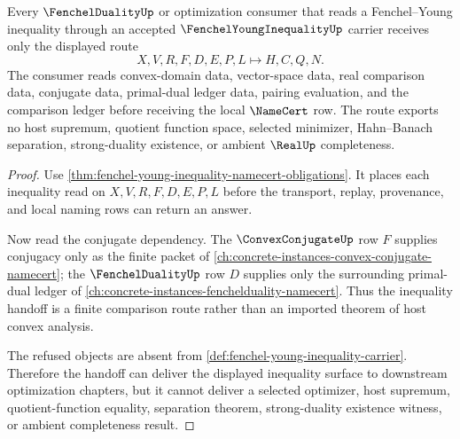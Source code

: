 \begin{theorem}\label{thm:fenchel-young-inequality-conjugate-handoff}
Every $\FenchelDualityUp$ or optimization consumer that reads a Fenchel--Young inequality through an accepted $\FenchelYoungInequalityUp$ carrier receives only the displayed route
$$
X,V,R,F,D,E,P,L\longmapsto H,C,Q,N.
$$
The consumer reads convex-domain data, vector-space data, real comparison data, conjugate data, primal-dual ledger data, pairing evaluation, and the comparison ledger before receiving the local $\NameCert$ row. The route exports no host supremum, quotient function space, selected minimizer, Hahn--Banach separation, strong-duality existence, or ambient $\RealUp$ completeness.
\end{theorem}
\begin{proof}
Use \autoref{thm:fenchel-young-inequality-namecert-obligations}. It places each inequality read on $X,V,R,F,D,E,P,L$ before the transport, replay, provenance, and local naming rows can return an answer.

Now read the conjugate dependency. The $\ConvexConjugateUp$ row $F$ supplies conjugacy only as the finite packet of \autoref{ch:concrete-instances-convex-conjugate-namecert}; the $\FenchelDualityUp$ row $D$ supplies only the surrounding primal-dual ledger of \autoref{ch:concrete-instances-fenchelduality-namecert}. Thus the inequality handoff is a finite comparison route rather than an imported theorem of host convex analysis.

The refused objects are absent from \autoref{def:fenchel-young-inequality-carrier}. Therefore the handoff can deliver the displayed inequality surface to downstream optimization chapters, but it cannot deliver a selected optimizer, host supremum, quotient-function equality, separation theorem, strong-duality existence witness, or ambient completeness result.
\end{proof}



